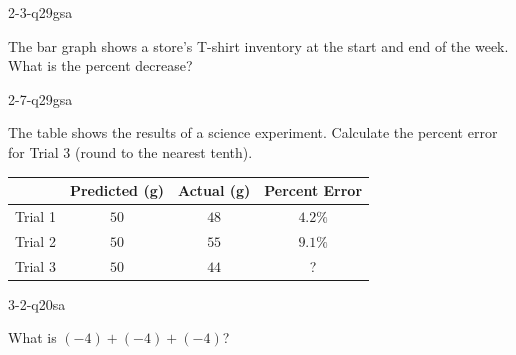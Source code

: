 \begin{practiceQuestion}{2-3-q29}{gsa}
\begin{questionText}
The bar graph shows a store's T-shirt inventory at the start and end of the week. What is the percent decrease?

\begin{center}
\end{center}
\end{questionText}
\end{practiceQuestion}

\begin{practiceQuestion}{2-7-q29}{gsa}
\begin{questionText}
The table shows the results of a science experiment. Calculate the percent error for Trial 3 (round to the nearest tenth).

\begin{center}
\begin{tabular}{|l|c|c|c|}
\hline
 & \textbf{Predicted (g)} & \textbf{Actual (g)} & \textbf{Percent Error} \\
\hline
Trial 1 & $50$ & $48$ & $4.2\%$ \\
\hline
Trial 2 & $50$ & $55$ & $9.1\%$ \\
\hline
Trial 3 & $50$ & $44$ & ? \\
\hline
\end{tabular}
\end{center}
\end{questionText}
\end{practiceQuestion}

\begin{practiceQuestion}{3-2-q20}{sa}
\begin{questionText}
What is $(-4) + (-4) + (-4)$?
\end{questionText}
\end{practiceQuestion}

